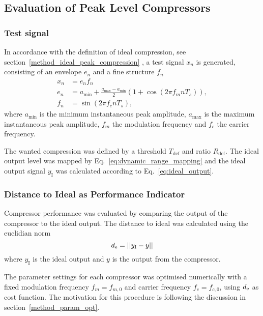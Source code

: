 \documentclass[../main2.tex]{subfiles}
\begin{document}
\subsection{Evaluation of Peak Level Compressors}\label{method_peak_compressors}
\subsubsection{Test signal}\label{method_test_signal}
In accordance with the definition of ideal compression, see section~\ref{method_ideal_peak_compression}
, a test signal $x_n$ is generated, consisting of an envelope $e_n$ and a fine structure $f_n$
\begin{equation}
\begin{split}
	x_n &=e_nf_n\\
	e_n &= a_\text{min} + \frac{a_\text{max}- a_\text{min}}{2} \left(1 + \cos(2 \pi f_m n T_s) \right), \\
	f_n &= \sin(2 \pi f_c n T_s),
\end{split} \label{eq:test_signal}
\end{equation}
where $a_\text{min}$ is the minimum instantaneous peak amplitude, $a_\text{max}$ is the maximum instantaneous peak amplitude, $f_m$ the modulation frequency and $f_c$ the carrier frequency.

The wanted compression was defined by a threshold $T_\text{def}$ and ratio $R_\text{def}$. The ideal output level was mapped by Eq.~\eqref{eq:dynamic_range_mapping} and the ideal output signal $y_\text{I}$ was calculated according to Eq.~\eqref{eq:ideal_output}.

\subsubsection{Distance to Ideal as Performance Indicator}\label{method_dist_ideal}
Compressor performance was evaluated by comparing the output of the compressor to the ideal output. The distance to ideal was calculated using the euclidian norm
\begin{equation}
d_\text{e} = ||y_\text{I} - y||
\end{equation}
where $y_\text{I}$ is the ideal output and $y$ is the output from the compressor.

The parameter settings for each compressor was optimised numerically with a fixed modulation frequency $f_m = f_{m,0}$ and carrier frequency $f_c = f_{c,0}$, using $d_\text{e}$ as cost function. The motivation for this procedure is following the discussion in section~\ref{method_param_opt}.
\end{document}
